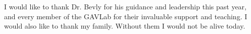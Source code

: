 I would like to thank Dr. Bevly for his guidance and leadership this past year, and every member of the GAVLab for their invaluable support and teaching. I would also like to thank my family. Without them I would not be alive today.